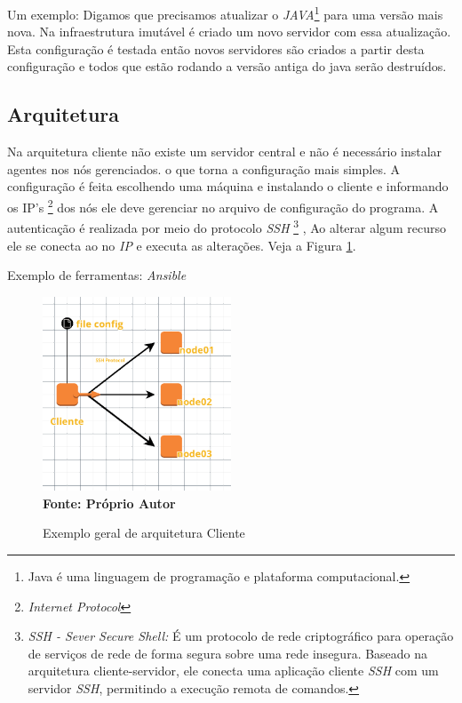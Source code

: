  Um exemplo: Digamos que precisamos atualizar o \textit{JAVA}\footnote{Java é uma linguagem de programação e plataforma computacional.} para uma versão mais nova. Na infraestrutura imutável é criado um novo servidor com essa atualização. Esta configuração é testada então novos servidores são criados a partir desta configuração e todos que estão rodando a versão antiga do java serão destruídos. 
 
\subsection{Arquitetura}

 \label{semagent}
Na arquitetura cliente não existe um servidor central e não é necessário instalar agentes nos nós gerenciados. 
o que torna a configuração mais simples. A configuração é feita escolhendo uma máquina e instalando o cliente e informando os IP's \footnote{\textit{Internet Protocol}} dos nós ele deve gerenciar no arquivo de configuração do programa. A autenticação é realizada por meio do protocolo \textit{SSH} \footnote{\textit{SSH - Sever Secure Shell:}  É um protocolo de rede criptográfico para operação de serviços de rede de forma segura sobre uma rede insegura. Baseado na arquitetura cliente-servidor, ele conecta uma aplicação cliente \textit{SSH} com um servidor \textit{SSH}, permitindo a execução remota de comandos.} , Ao alterar algum recurso ele se conecta ao no \textit{IP} e executa as alterações. Veja a Figura \ref{fig:figura3}. 

Exemplo de ferramentas: \textit{Ansible}

\begin{figure}[ht]
	\centering	
	\caption[\hspace{0.1cm}Exemplo arquitetura Cliente]{Exemplo geral de arquitetura Cliente}
	\vspace{-0.4cm}
	\includegraphics[width=0.5\textwidth]{figuras/cliente.png}
	 \vspace{-0.2cm}
	\\\textbf{\footnotesize Fonte: Próprio Autor}
	\label{fig:figura3}
\end{figure}
\vspace{-0.5cm}


